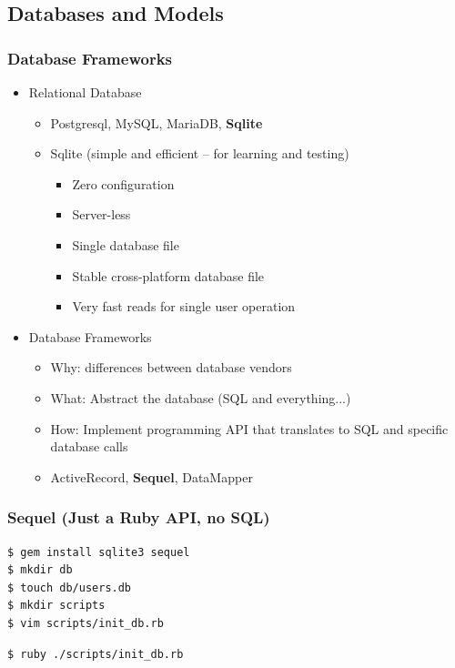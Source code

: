 \documentclass{beamer}
\begin{document}
\subsection{Databases and Models}
\begin{frame}[fragile]\frametitle{Database Frameworks}

  \begin{itemize}
    \item Relational Database
    \begin{itemize}
      \item Postgresql, MySQL, MariaDB, \textbf{Sqlite}
      \item Sqlite (simple and efficient -- for learning and testing)
      \begin{itemize}
        \item Zero configuration
        \item Server-less
        \item Single database file
        \item Stable cross-platform database file
        \item Very fast reads for single user operation
      \end{itemize}

    \end{itemize}

    \item Database Frameworks
    \begin{itemize}
      \item Why: differences between database vendors
      \item What: Abstract the database (SQL and everything...)
      \item How: Implement programming API that translates to SQL and specific database calls
      \item ActiveRecord, \textbf{Sequel}, DataMapper
    \end{itemize}

  \end{itemize}

\end{frame}




\begin{frame}[fragile]\frametitle{Sequel (Just a Ruby API, no SQL)}

  \begin{lstlisting}[language=bash, escapechar={^}]
$ gem install sqlite3 sequel
$ mkdir db
$ touch db/users.db
$ mkdir scripts
$ vim scripts/init_db.rb 
  \end{lstlisting}

  

  \begin{lstlisting}[language=bash, escapechar={^}]
$ ruby ./scripts/init_db.rb
  \end{lstlisting}
  
\end{frame}
\end{document}
